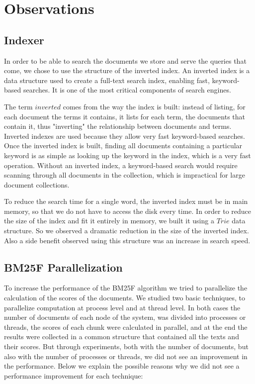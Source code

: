 \documentclass{article}
\begin{document}
\section{Observations}

\subsection{Indexer}
In order to be able to search the documents we store and serve the queries that come, we chose 
to use the structure of the inverted index. An inverted index is a data structure used to create 
a full-text search index, enabling fast, keyword-based searches. It is one of the most critical 
components of search engines.

The term $inverted$ comes from the way the index is built: instead of listing, for each document 
the terms it contains, it lists for each term, the documents that contain it, thus "inverting" 
the relationship between documents and terms. Inverted indexes are used because they allow very 
fast keyword-based searches. Once the inverted index is built, finding all documents containing 
a particular keyword is as simple as looking up the keyword in the index, which is a very fast 
operation. Without an inverted index, a keyword-based search would require scanning through all 
documents in the collection, which is impractical for large document collections.

To reduce the search time for a single word, the inverted index must be in main memory, so that 
we do not have to access the disk every time. In order to reduce the size of the index and fit it 
entirely in memory, we built it using a $Trie$ data structure. So we observed a dramatic reduction 
in the size of the inverted index. Also a side benefit observed using this structure was an 
increase in search speed.

\subsection{BM25F Parallelization}
To increase the performance of the BM25F algorithm we tried to parallelize the calculation of the 
scores of the documents. We studied two basic techniques, to parallelize computation at process 
level and at thread level. In both cases the number of documents of each node of the system, was 
divided into processes or threads, the scores of each chunk were calculated in parallel, and at 
the end the results were collected in a common structure that contained all the texts and their 
scores. But through experiments, both with the number of documents, but also with the number of 
processes or threads, we did not see an improvement in the performance. Below we explain the 
possible reasons why we did not see a performance improvement for each technique:
\end{document}
